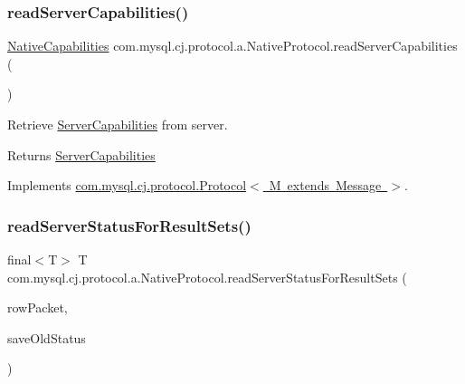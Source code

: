 \mbox{\label{classcom_1_1mysql_1_1cj_1_1protocol_1_1a_1_1_native_protocol_acfce17a81631146efc0ca8d9cef22880}} 
\subsubsection{\texorpdfstring{read\+Server\+Capabilities()}{readServerCapabilities()}}
{\footnotesize\ttfamily \mbox{\hyperlink{classcom_1_1mysql_1_1cj_1_1protocol_1_1a_1_1_native_capabilities}{Native\+Capabilities}} com.\+mysql.\+cj.\+protocol.\+a.\+Native\+Protocol.\+read\+Server\+Capabilities (\begin{DoxyParamCaption}{ }\end{DoxyParamCaption})}

Retrieve \mbox{\hyperlink{interfacecom_1_1mysql_1_1cj_1_1protocol_1_1_server_capabilities}{Server\+Capabilities}} from server.

\begin{DoxyReturn}{Returns}
\mbox{\hyperlink{interfacecom_1_1mysql_1_1cj_1_1protocol_1_1_server_capabilities}{Server\+Capabilities}} 
\end{DoxyReturn}


Implements \mbox{\hyperlink{interfacecom_1_1mysql_1_1cj_1_1protocol_1_1_protocol_ac7608c87247ae3467a9f1e3e8c254042}{com.\+mysql.\+cj.\+protocol.\+Protocol$<$ M extends Message $>$}}.

\mbox{\label{classcom_1_1mysql_1_1cj_1_1protocol_1_1a_1_1_native_protocol_a0e6a8f5b4abd6810e2e4ca5b2ebf15fd}} 
\subsubsection{\texorpdfstring{read\+Server\+Status\+For\+Result\+Sets()}{readServerStatusForResultSets()}}
{\footnotesize\ttfamily final$<$T$>$ T com.\+mysql.\+cj.\+protocol.\+a.\+Native\+Protocol.\+read\+Server\+Status\+For\+Result\+Sets (\begin{DoxyParamCaption}\item[{\mbox{\hyperlink{classcom_1_1mysql_1_1cj_1_1protocol_1_1a_1_1_native_packet_payload}{Native\+Packet\+Payload}}}]{row\+Packet,  }\item[{boolean}]{save\+Old\+Status }\end{DoxyParamCaption})}


